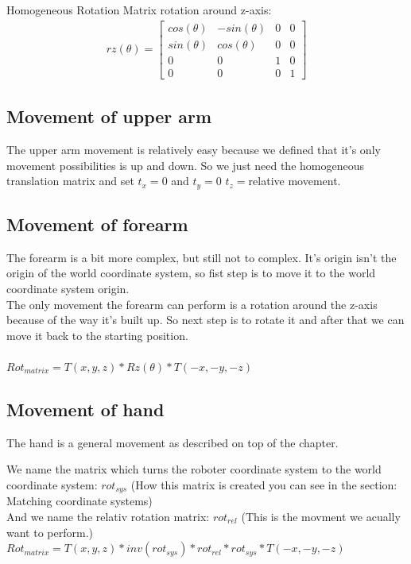Homogeneous Rotation Matrix rotation around z-axis:
\begin{align*}
rz(\theta)=
\begin{bmatrix} 
cos(\theta) & -sin(\theta) & 0 & 0 \\ 
sin(\theta) & cos(\theta) & 0 & 0 \\ 
0 & 0 & 1 & 0 \\ 
0 & 0 & 0 & 1
\end{bmatrix}
\end{align*}



\subsection{Movement of upper arm}

The upper arm movement is relatively easy because we defined that it's only movement possibilities is up and down. So we just need the homogeneous translation matrix and set $t_x=0$ and $t_y=0$ $t_z=$relative movement.

\subsection{Movement of forearm}
The forearm is a bit more complex, but still not to complex. It's origin isn't the origin of the world coordinate system, so fist step is to move it to the world coordinate system origin.\\
The only movement the forearm can perform is a rotation around the z-axis because of the way it's built up. So next step is to rotate it and after that we can move it back to the starting position.\\\\
$Rot_{matrix}=T(x,y,z)*Rz(\theta)*T(-x,-y,-z)$

\subsection{Movement of hand}
The hand is a general movement as described on top of the chapter.

We name the matrix which turns the roboter coordinate system to the world coordinate system: $rot_{sys}$ (How this matrix is created you can see in the section: Matching coordinate systems)\\
And we name the relativ rotation matrix: $rot_{rel}$ (This is the movment we acually want to perform.)\\
$Rot_{matrix}=T(x,y,z)*inv(rot_{sys})*rot_{rel}*rot_{sys}*T(-x,-y,-z)$

